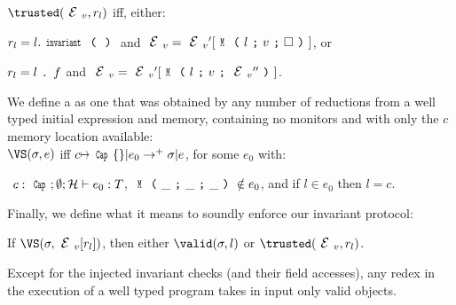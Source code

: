\indent $\trusted(\EV,r_l)$ iff, either:
\begin{iitemize}
\item $r_l=l.\invariant$ and
$\EV=\EV'[\M{l}{v}{\square}]$, or
\item $r_l=l{ \mbox{ {\texttt{.}} } } f$ and
$\EV=\EV'[\M{l}{v}{\EV''}]$.
\end{iitemize}

\noindent We define a \VS as one that was obtained by any number of reductions from a well typed initial expression and memory, containing no monitors and with only the $c$ memory location available:\\
\indent $\VS(\s, e)$ iff $c\mapsto\Kw{Cap}\{\}|e_0\rightarrow^+ \s|e$, for some $e_0$ with:
\begin{iitemize}%
\item[] ${}_{}$\quad${}_{}$ $c:\Kw{Cap};\emptyset; \h \vdash e_0: 	T$, $\M{\_}{\_}{\_} \notin e_0$, and if $l \in e_0$ then $l = c$.
\end{iitemize}

\noindent Finally, we define what it means to soundly enforce our invariant protocol:
\SS\begin{theorem}[Soundness]\rm
If $\VS(\s, \EV[r_l])$, then either $\valid(\s,l)$ or $\trusted(\EV,r_l)$.
\end{theorem}
Except for the injected invariant checks (and their field accesses),
any redex in the execution of a well typed program takes in input only valid objects.

